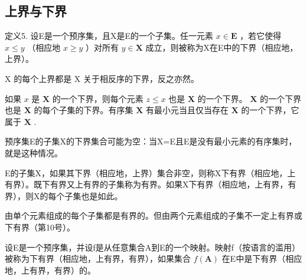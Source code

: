 \subsection{上界与下界}

定义5. 设E是一个预序集，且X是E的一个子集。任一元素 \(x \in \mathbf{E}\) ，若它使得 \(x \leqslant y\) （相应地 \(x \geqslant y\) ）对所有 \(y \in \mathbf{X}\) 成立，则被称为X在E中的下界（相应地，上界）。

X 的每个上界都是 X 关于相反序的下界，反之亦然。

如果 \(x\) 是 \(\mathbf{X}\) 的一个下界，则每个元素 \(z \leqslant x\) 也是 \(\mathbf{X}\) 的一个下界。 \(\mathbf{X}\) 的一个下界也是 \(\mathbf{X}\) 的每个子集的下界。有序集 \(\mathbf{X}\) 有最小元当且仅当存在 \(\mathbf{X}\) 的一个下界，它属于 \(\mathbf{X}\) .

预序集E的子集X的下界集合可能为空：当X=E且E是没有最小元素的有序集时，就是这种情况。

E的子集X，如果其下界（相应地，上界）集合非空，则称X下有界（相应地，上有界）。既下有界又上有界的子集称为有界。如果X下有界（相应地，上有界，有界），则X的每个子集也是如此。

由单个元素组成的每个子集都是有界的。但由两个元素组成的子集不一定上有界或下有界（第10号）。

设E是一个预序集，并设f是从任意集合A到E的一个映射。映射f（按语言的滥用）被称为下有界（相应地，上有界，有界），如果集合 \(f(\mathbf{A})\) 在E中是下有界（相应地，上有界，有界）的。

